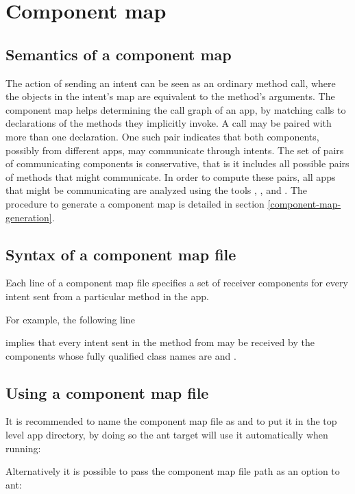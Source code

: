 \section{Component map\label{component-map}}

\subsection{Semantics of a component map}
The action of sending an intent can be seen as an ordinary method call,
where the objects in the intent's
map are equivalent to the method's arguments. The component map helps
determining the call graph of an app, by matching \sendIntent{} calls to
declarations of the \onReceive{} methods they implicitly invoke. A \sendIntent{}
call may be paired with more than one \onReceive{} declaration. One such pair
indicates that both components, possibly from different apps, may communicate
through intents. The set of pairs of communicating components is
conservative, that is it includes all possible pairs of methods that might
communicate. In order to compute these pairs, all apps that might be
communicating are analyzed using the tools , , and
. The procedure to generate a component map is detailed in section
\ref{component-map-generation}.


\subsection{Syntax of a component map file}
Each line of a component map file specifies a set of receiver components for 
every intent sent from a particular method in the app.

For example, the following line


\noindent
implies that every intent sent in the method  from 
 may be received by the components whose fully qualified class 
names are  and .

\subsection{Using a component map file}
It is recommended to name the component map file as  and to
put it in the top level app directory, by doing so the ant target will use it
automatically when running:


\noindent
Alternatively it is possible to pass the component map file path as an option
to ant:




